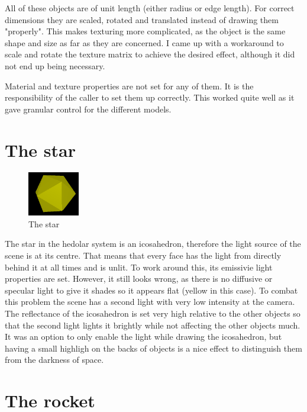 \documentclass[10pt]{article}
\begin{document}
        All of these objects are of unit length (either radius or edge length).
        For correct dimensions they are scaled, rotated and translated instead
        of drawing them "properly". This makes texturing more complicated, as
        the object is the same shape and size as far as they are concerned. I
        came up with a workaround to scale and rotate the texture matrix to
        achieve the desired effect, although it did not end up being necessary.

        Material and texture properties are not set for any of them. It is the
        responsibility of the caller to set them up correctly. This worked
        quite well as it gave granular control for the different models.


    \section{The star}

        \begin{figure}
            \caption{The star}
            \includegraphics[width=0.2\textwidth]{star}
        \end{figure}

        The star in the hedolar system is an icosahedron, therefore the light
        source of the scene is at its centre. That means that every face has
        the light from directly behind it at all times and is unlit. To work
        around this, its emissivie light properties are set. However, it still
        looks wrong, as there is no diffusive or specular light to give it
        shades so it appears flat (yellow in this case). To combat this problem
        the scene has a second light with very low intensity at the camera. The
        reflectance of the icosahedron is set very high relative to the other
        objects so that the second light lights it brightly while not affecting
        the other objects much. It was an option to only enable the light while
        drawing the icosahedron, but having a small highligh on the backs of
        objects is a nice effect to distinguish them from the darkness of
        space.


    \section{The rocket}
\end{document}
